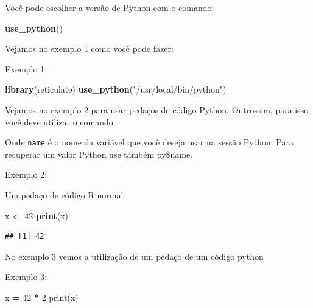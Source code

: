 \documentclass[
]{book}
\newenvironment{Shaded}{\begin{snugshade}}{\end{snugshade}}
\newcommand{\BuiltInTok}[1]{#1}
\newcommand{\DecValTok}[1]{\textcolor[rgb]{0.00,0.00,0.81}{#1}}
\newcommand{\KeywordTok}[1]{\textcolor[rgb]{0.13,0.29,0.53}{\textbf{#1}}}
\newcommand{\NormalTok}[1]{#1}
\newcommand{\OperatorTok}[1]{\textcolor[rgb]{0.81,0.36,0.00}{\textbf{#1}}}
\newcommand{\StringTok}[1]{\textcolor[rgb]{0.31,0.60,0.02}{#1}}
\begin{document}
Você pode escolher a versão de Python com o comando:

\begin{Shaded}
\begin{Highlighting}[]
\KeywordTok{use\_python}\NormalTok{()}
\end{Highlighting}
\end{Shaded}

Vejamos no exemplo 1 como você pode fazer:

Exemplo 1:

\begin{Shaded}
\begin{Highlighting}[]
\KeywordTok{library}\NormalTok{(reticulate)}
\KeywordTok{use\_python}\NormalTok{(}\StringTok{"/usr/local/bin/python"}\NormalTok{)}
\end{Highlighting}
\end{Shaded}

Vejamos no exemplo 2 para usar pedaços de código Python. Outrossim, para isso você deve utilizar o comando

\begin{Shaded}
\end{Shaded}

Onde \texttt{name} é o nome da variável que você deseja usar na sessão Python. Para recuperar um valor Python use também py\$name.

Exemplo 2:

Um pedaço de código R normal

\begin{Shaded}
\begin{Highlighting}[]
\NormalTok{x \textless{}{-}}\StringTok{ }\DecValTok{42}
\KeywordTok{print}\NormalTok{(x)}
\end{Highlighting}
\end{Shaded}

\begin{verbatim}
## [1] 42
\end{verbatim}

No exemplo 3 vemos a utilização de um pedaço de um código python

Exemplo 3:

\begin{Shaded}
\begin{Highlighting}[]
\NormalTok{x }\OperatorTok{=} \DecValTok{42} \OperatorTok{*} \DecValTok{2}
\BuiltInTok{print}\NormalTok{(x)}
\end{Highlighting}
\end{Shaded}
\end{document}
